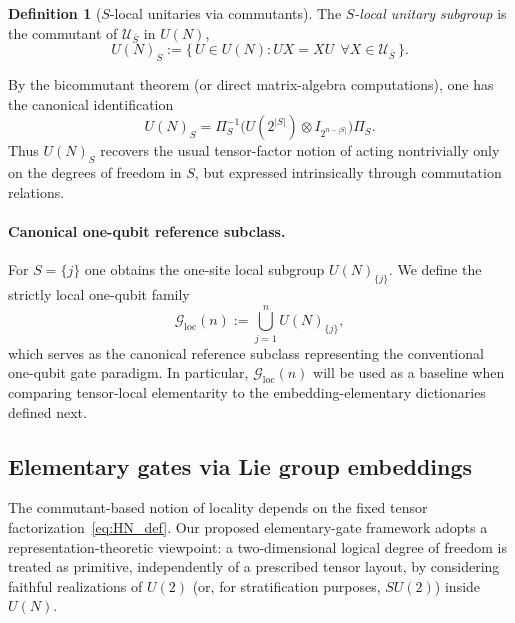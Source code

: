 \documentclass{article}%
\theoremstyle{definition}
\newtheorem{definition}[theorem]{Definition}
\numberwithin{equation}{section}
\begin{document}
\begin{definition}[$S$-local unitaries via commutants]\label{def:S_local_commutant}
The \emph{$S$-local unitary subgroup} is the commutant of $\mathcal{U}_{\bar S}$ in $U(N)$,
\begin{equation}\label{eq:S_local_commutant}
U(N)_S:=\{\,U\in U(N): UX=XU\ \ \forall X\in \mathcal{U}_{\bar S}\,\}.
\end{equation}
\end{definition}

\noindent
By the bicommutant theorem (or direct matrix-algebra computations), one has the canonical
identification
\begin{equation}\label{eq:S_local_structure}
U(N)_S = \Pi_S^{-1}\big(U(2^{|S|})\otimes I_{2^{n-|S|}}\big)\Pi_S.
\end{equation}
Thus $U(N)_S$ recovers the usual tensor-factor notion of acting nontrivially only on the degrees of
freedom in $S$, but expressed intrinsically through commutation relations.

\paragraph{Canonical one-qubit reference subclass.}
For $S=\{j\}$ one obtains the one-site local subgroup $U(N)_{\{j\}}$. We define the strictly local
one-qubit family
\begin{equation}\label{eq:Gloc_def}
\mathcal{G}_{\mathrm{loc}}(n):=\bigcup_{j=1}^n U(N)_{\{j\}},
\end{equation}
which serves as the canonical reference subclass representing the conventional one-qubit gate
paradigm. In particular, $\mathcal{G}_{\mathrm{loc}}(n)$ will be used as a baseline when comparing
tensor-local elementarity to the embedding-elementary dictionaries defined next.


\subsection{Elementary gates via Lie group embeddings}
\label{subsec:elementary_via_embeddings}
The commutant-based notion of locality depends on the fixed tensor factorization~\eqref{eq:HN_def}.
Our proposed elementary-gate framework adopts a representation-theoretic viewpoint: a two-dimensional
logical degree of freedom is treated as primitive, independently of a prescribed tensor layout, by
considering faithful realizations of $U(2)$ (or, for stratification purposes, $SU(2)$) inside $U(N)$.
\end{document}
